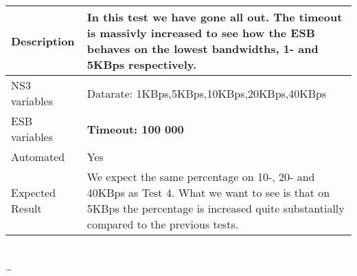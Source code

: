 \begin{center}
\begin{tabular}{| p{4cm} | p{8cm} |}
\hline
Description & In this test we have gone all out. The timeout is massivly increased to see how the ESB behaves on the lowest bandwidths, 1- and 5KBps respectively.  \\
\hline
NS3 variables & Datarate: 1KBps,5KBps,10KBps,20KBps,40KBps \\
\hline
ESB variables & \textbf{Timeout: 100 000} \\
\hline
Automated & Yes \\
\hline
Expected Result & We expect the same percentage on 10-, 20- and 40KBps as Test 4. What we want to see is that on 5KBps the percentage is increased quite substantially compared to the previous tests. \\
\hline
\end{tabular}
\\ \ldots \\
\end{center}
